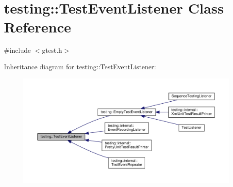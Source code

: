 \hypertarget{classtesting_1_1_test_event_listener}{}\section{testing\+:\+:Test\+Event\+Listener Class Reference}
\label{classtesting_1_1_test_event_listener}


{\ttfamily \#include $<$gtest.\+h$>$}



Inheritance diagram for testing\+:\+:Test\+Event\+Listener\+:
\nopagebreak
\begin{figure}[H]
\begin{center}
\leavevmode
\includegraphics[width=350pt]{classtesting_1_1_test_event_listener__inherit__graph}
\end{center}
\end{figure}
